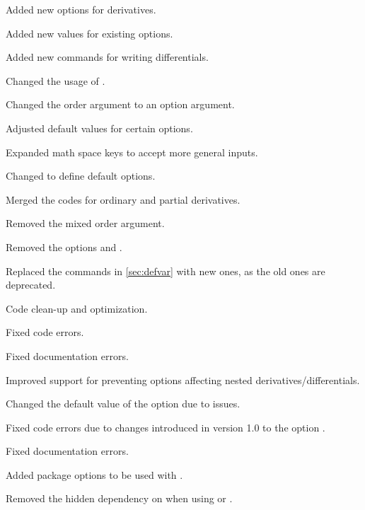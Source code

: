 \begin{changelog}
	\smallskip
	\begin{change}[version=1.0, date=2021-05-25, beta=false]
		\item Added new options for derivatives.
		\item Added new values for existing options.
		\item Added new commands for writing differentials.
		\item Changed the usage of .
		\item Changed the order argument to an option argument.
		\item Adjusted default values for certain options.
		\item Expanded math space keys to accept more general inputs.
		\item Changed  to define default options.
		\item Merged the codes for ordinary and partial derivatives.
		\item Removed the mixed order argument.
		\item Removed the options  and .
		\item Replaced the commands in \cref{sec:defvar} with new ones, as the old ones are deprecated.
		\item Code clean-up and optimization.
		\item Fixed code errors.
		\item Fixed documentation errors.
		\item Improved support for preventing options affecting nested derivatives/differentials.
	\end{change}
	\begin{change}[version=1.01, date=2021-05-28, beta=false]
		\item Changed the default value of the option  due to issues.
		\item Fixed code errors due to changes introduced in version 1.0 to the option .
		\item Fixed documentation errors.
	\end{change}
	\begin{change}[version=1.1, date=2021-06-03, beta=false]
		\item Added package options to be used with .
		\item Removed the hidden dependency on  when using \xetex{} or \luatex.

\end{change}
\end{changelog}
